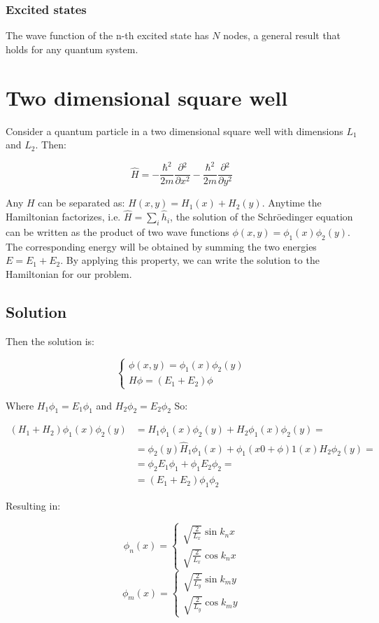     \subsubsection{Excited states}
    The wave function of the n-th excited state has $N$ nodes, a general result that holds for any quantum system.

\section{Two dimensional square well}
Consider a quantum particle in a two dimensional square well with dimensions $L_1$ and $L_2$.
Then:

$$\hat{H} = -\frac{\hbar^2}{2m}\frac{\partial {^2}}{\partial {x^2}}-\frac{\hbar^2}{2m}\frac{\partial {^2}}{\partial {y^2}}$$

Any $H$ can be separated as: $H(x,y) = H_1(x) + H_2(y)$.
Anytime the Hamiltonian factorizes, i.e. $\hat{H}=\sum_i{\hat{h}_i}$, the solution of the Schr\"oedinger equation can be written as the product of two wave functions $\phi(x,y)=\phi_1(x)\phi_2(y)$. The corresponding energy will be obtained by summing the two energies $E=E_1+E_2$. By applying this property, we can write the solution to the Hamiltonian for our problem.

  \subsection{Solution}
  Then the solution is:

  $$\begin{cases}\phi(x,y) = \phi_1(x)\phi_2(y)\\H\phi=(E_1+E_2)\phi\end{cases}$$

  Where $H_1\phi_1 = E_1\phi_1$  and $H_2\phi_2 = E_2\phi_2$
  So:

  \begin{align*}
    (H_1 + H_2)\phi_1(x)\phi_2(y) &= H_1\phi_1(x)\phi_2(y) + H_2\phi_1(x)\phi_2(y)=\\
                                  &= \phi_2(y)\hat{H}_1\phi_1(x)+\phi_1(x0+\phi)1(x)H_2\phi_2(y)=\\
                                  &= \phi_2 E_1\phi_1 + \phi_1E_2\phi_2=\\
                                  &=(E_1+E_2)\phi_1\phi_2
  \end{align*}

 Resulting in:

  $$\phi_n(x) = \begin{cases}\sqrt{\frac{2}{L_{x}}} \sin k_n x\\ \sqrt{\frac{2}{L_{x}}} \cos k_n x\end{cases}$$
  $$\phi_m(x) = \begin{cases}\sqrt{\frac{2}{L_{y}}} \sin k_m y\\ \sqrt{\frac{2}{L_{y}}} \cos k_m y\end{cases}$$

